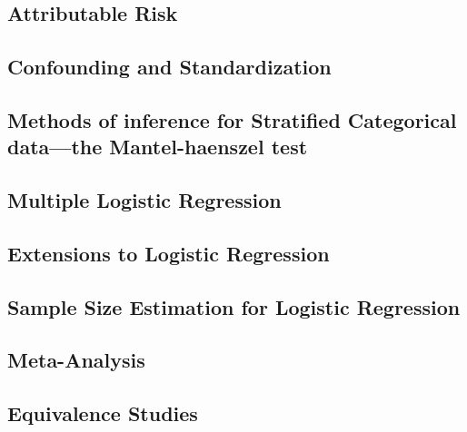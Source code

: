 \documentclass[12pt,]{article}
\begin{document}
\hypertarget{attributable-risk}{%
\subsection{Attributable Risk}\label{attributable-risk}}

\hypertarget{confounding-and-standardization}{%
\subsection{Confounding and
Standardization}\label{confounding-and-standardization}}

\hypertarget{methods-of-inference-for-stratified-categorical-datathe-mantel-haenszel-test}{%
\subsection{Methods of inference for Stratified Categorical data---the
Mantel-haenszel
test}\label{methods-of-inference-for-stratified-categorical-datathe-mantel-haenszel-test}}

\hypertarget{multiple-logistic-regression}{%
\subsection{Multiple Logistic
Regression}\label{multiple-logistic-regression}}

\hypertarget{extensions-to-logistic-regression}{%
\subsection{Extensions to Logistic
Regression}\label{extensions-to-logistic-regression}}

\hypertarget{sample-size-estimation-for-logistic-regression}{%
\subsection{Sample Size Estimation for Logistic
Regression}\label{sample-size-estimation-for-logistic-regression}}

\hypertarget{meta-analysis}{%
\subsection{Meta-Analysis}\label{meta-analysis}}

\hypertarget{equivalence-studies}{%
\subsection{Equivalence Studies}\label{equivalence-studies}}
\end{document}
